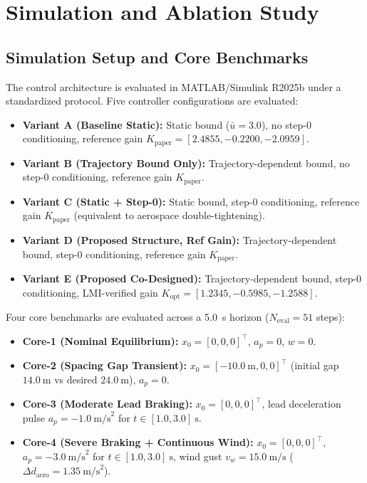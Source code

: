 \documentclass[journal]{IEEEtran}
\begin{document}
\section{Simulation and Ablation Study}

\subsection{Simulation Setup and Core Benchmarks}

The control architecture is evaluated in MATLAB/Simulink R2025b under a standardized protocol. Five controller configurations are evaluated:
\begin{itemize}
    \item \textbf{Variant A (Baseline Static):} Static bound ($\bar u = 3.0$), no step-0 conditioning, reference gain $K_{\mathrm{paper}} = [2.4855, -0.2200, -2.0959]$.
    \item \textbf{Variant B (Trajectory Bound Only):} Trajectory-dependent bound, no step-0 conditioning, reference gain $K_{\mathrm{paper}}$.
    \item \textbf{Variant C (Static + Step-0):} Static bound, step-0 conditioning, reference gain $K_{\mathrm{paper}}$ (equivalent to aerospace double-tightening).
    \item \textbf{Variant D (Proposed Structure, Ref Gain):} Trajectory-dependent bound, step-0 conditioning, reference gain $K_{\mathrm{paper}}$.
    \item \textbf{Variant E (Proposed Co-Designed):} Trajectory-dependent bound, step-0 conditioning, LMI-verified gain $K_{\mathrm{opt}} = [1.2345, -0.5985, -1.2588]$.
\end{itemize}

Four core benchmarks are evaluated across a 5.0~s horizon ($N_{\mathrm{eval}} = 51$ steps):
\begin{itemize}
    \item \textbf{Core-1 (Nominal Equilibrium):} $x_0 = [0, 0, 0]^\top$, $a_p = 0$, $w = 0$.
    \item \textbf{Core-2 (Spacing Gap Transient):} $x_0 = [-10.0~\text{m}, 0, 0]^\top$ (initial gap $14.0~\text{m}$ vs desired $24.0~\text{m}$), $a_p = 0$.
    \item \textbf{Core-3 (Moderate Lead Braking):} $x_0 = [0, 0, 0]^\top$, lead deceleration pulse $a_p = -1.0~\text{m/s}^2$ for $t \in [1.0, 3.0]~\text{s}$.
    \item \textbf{Core-4 (Severe Braking + Continuous Wind):} $x_0 = [0, 0, 0]^\top$, $a_p = -3.0~\text{m/s}^2$ for $t \in [1.0, 3.0]~\text{s}$, wind gust $v_w = 15.0~\text{m/s}$ ($\Delta d_{\mathrm{aero}} = 1.35~\text{m/s}^2$).
\end{itemize}
\end{document}

